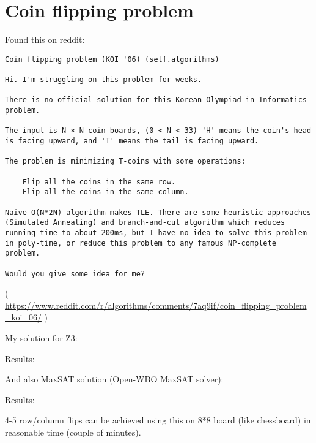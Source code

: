 \section{Coin flipping problem}
\label{coin_flip}

Found this on reddit:

\begin{lstlisting}
Coin flipping problem (KOI '06) (self.algorithms)

Hi. I'm struggling on this problem for weeks.

There is no official solution for this Korean Olympiad in Informatics problem.

The input is N × N coin boards, (0 < N < 33) 'H' means the coin's head is facing upward, and 'T' means the tail is facing upward.

The problem is minimizing T-coins with some operations:

    Flip all the coins in the same row.
    Flip all the coins in the same column.

Naïve O(N*2N) algorithm makes TLE. There are some heuristic approaches (Simulated Annealing) and branch-and-cut algorithm which reduces running time to about 200ms, but I have no idea to solve this problem in poly-time, or reduce this problem to any famous NP-complete problem.

Would you give some idea for me?
\end{lstlisting}

( \url{https://www.reddit.com/r/algorithms/comments/7aq9if/coin_flipping_problem_koi_06/} )

My solution for Z3:



Results:



And also MaxSAT solution (Open-WBO MaxSAT solver): 



Results:



4-5 row/column flips can be achieved using this on 8*8 board (like chessboard) in reasonable time (couple of minutes).


